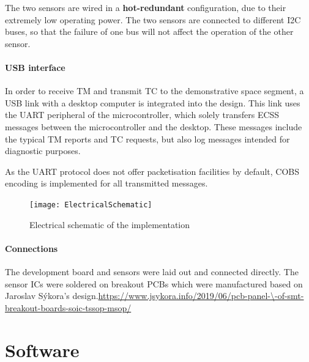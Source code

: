 \documentclass[a4paper,nobib]{tufte-book}
\begin{document}

The two sensors are wired in a \textbf{hot-redundant} configuration, due to their extremely low operating power. The two sensors are connected to different \ac{I2C} buses, so that the failure of one bus will not affect the operation of the other sensor.

\paragraph{\acs{USB} interface} In order to receive \acl{TM} and transmit \acl{TC} to the demonstrative space segment, a \acs{USB} link with a desktop computer is integrated into the design. This link uses the \acs{UART} peripheral of the microcontroller, which solely transfers \acs{ECSS} messages between the microcontroller and the desktop. These messages include the typical \acs{TM} reports and \acs{TC} requests, but also log messages intended for diagnostic purposes.

As the \acs{UART} protocol does not offer packetisation facilities by default, \ac{COBS} encoding \autocite{cheshire_consistent_overhead_1997} is implemented for all transmitted messages.

\begin{figure}[h]
	\texttt{[image: ElectricalSchematic]}
	\caption{Electrical schematic of the implementation}
	\label{fig:schematic}
\end{figure}

\paragraph{Connections}
The development board and sensors were laid out and connected directly. The sensor \acp{IC} were soldered on breakout \acp{PCB} which were manufactured based on Jaroslav Sýkora's design.\url{https://www.jsykora.info/2019/06/pcb-panel-\-of-smt-breakout-boards-soic-tssop-msop/}

\section{Software}
\end{document}
